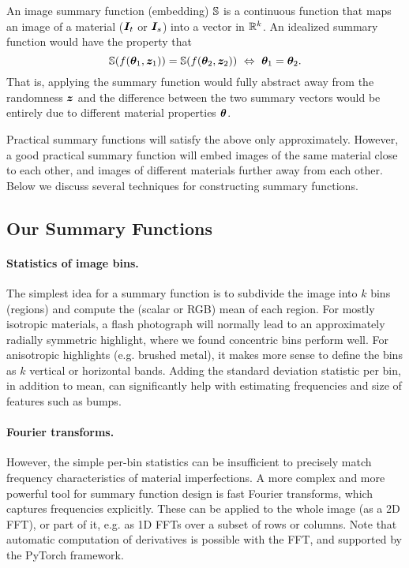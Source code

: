 An image summary function (embedding) $\mathbb{S}$ is a continuous function that maps an image of a material ($\bm{I}_t$ or $\bm{I}_s$) into a vector in $\mathbb{R}^k$. An idealized summary function would have the property that
%
\begin{equation}
	\mathbb{S}(f(\bm{\theta}_1, \bm{z}_1)) = \mathbb{S}(f(\bm{\theta}_2, \bm{z}_2)) \ \Leftrightarrow \ \bm{\theta}_1 = \bm{\theta}_2.
\end{equation}
%
That is, applying the summary function would fully abstract away from the randomness $\bm{z}$ and the difference between the two summary vectors would be entirely due to different material properties $\bm{\theta}$.

Practical summary functions will satisfy the above only approximately. However, a good practical summary function will embed images of the same material close to each other, and images of different materials further away from each other. Below we discuss several techniques for constructing summary functions.

\subsection{Our Summary Functions}
\label{ssec:example_summary_func}

\paragraph{Statistics of image bins.}
The simplest idea for a summary function is to subdivide the image into $k$ bins (regions) and compute the (scalar or RGB) mean of each region. For mostly isotropic materials, a flash photograph will normally lead to an approximately radially symmetric highlight, where we found concentric bins perform well. For anisotropic highlights (e.g. brushed metal), it makes more sense to define the bins as $k$ vertical or horizontal bands. Adding the standard deviation statistic per bin, in addition to mean, can significantly help with estimating frequencies and size of features such as bumps.

\paragraph{Fourier transforms.}
However, the simple per-bin statistics can be insufficient to precisely match frequency characteristics of material imperfections. A more complex and more powerful tool for summary function design is fast Fourier transforms, which captures frequencies explicitly. These can be applied to the whole image (as a 2D FFT), or part of it, e.g. as 1D FFTs over a subset of rows or columns. Note that automatic computation of derivatives is possible with the FFT, and supported by the PyTorch framework.

